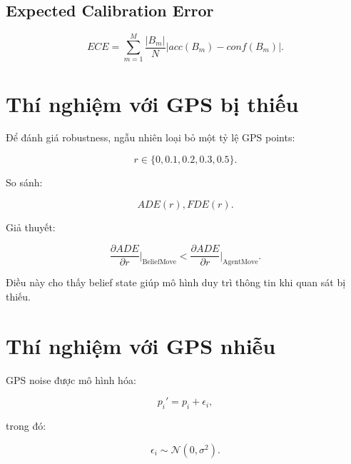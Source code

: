\documentclass[11pt,a4paper]{article}
\begin{document}
	\subsection{Expected Calibration Error}
	
	\begin{equation}
		ECE
		=
		\sum_{m=1}^{M}
		\frac{|B_m|}{N}
		\left|
		acc(B_m)-conf(B_m)
		\right|.
	\end{equation}
	
	\section{Thí nghiệm với GPS bị thiếu}
	
	Để đánh giá robustness, ngẫu nhiên loại bỏ một tỷ lệ GPS points:
	
	\begin{equation}
		r
		\in
		\{
		0,
		0.1,
		0.2,
		0.3,
		0.5
		\}.
	\end{equation}
	
	So sánh:
	
	\begin{equation}
		ADE(r),
		FDE(r).
	\end{equation}
	
	Giả thuyết:
	
	\begin{equation}
		\frac{\partial ADE}{\partial r}
		\Bigg|_{\text{BeliefMove}}
		<
		\frac{\partial ADE}{\partial r}
		\Bigg|_{\text{AgentMove}}.
	\end{equation}
	
	Điều này cho thấy belief state giúp mô hình duy trì thông tin khi quan sát
	bị thiếu.
	
	\section{Thí nghiệm với GPS nhiễu}
	
	GPS noise được mô hình hóa:
	
	\begin{equation}
		p_i'
		=
		p_i+\epsilon_i,
	\end{equation}
	
	trong đó:
	
	\begin{equation}
		\epsilon_i
		\sim
		\mathcal{N}(0,\sigma^2).
	\end{equation}
	
\end{document}
